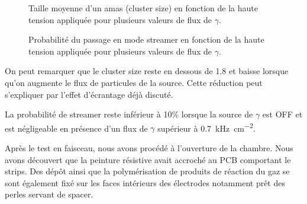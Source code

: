 \begin{figure}
	\centering
	\scalebox{1.3}{}
	\caption{Taille moyenne d'un amas (cluster size) en fonction de la haute tension appliquée pour plusieurs valeurs de flux de $\gamma$.}
	\label{clustersize}
\end{figure}
\begin{figure}
	\centering
	\scalebox{1.3}{}
	\caption{Probabilité du passage en mode streamer en fonction de la haute tension appliquée pour plusieurs valeurs de flux de $\gamma$.}
	\label{probastreamer}
\end{figure}

On peut remarquer que le cluster size reste en dessous de \num{1.8} et baisse lorsque qu'on augmente le flux de particules de la source. Cette réduction peut s'expliquer par l'effet d'écrantage déjà discuté.

La probabilité de streamer reste inférieur à 10\% lorsque la source de $\gamma$ est OFF et est négligeable en présence d'un flux de $\gamma$ supérieur à \SI{0.7}{\kilo\hertz\per\square\centi\meter}.

Après le test en faisceau, nous avons procédé à l'ouverture de la chambre. Nous avons découvert que la peinture résistive avait accroché au PCB comportant le strips. Des dépôt ainsi que la polymérisation de produits de réaction du gaz se sont également fixé sur les faces intérieurs des électrodes notamment prêt des perles servant de spacer. 

